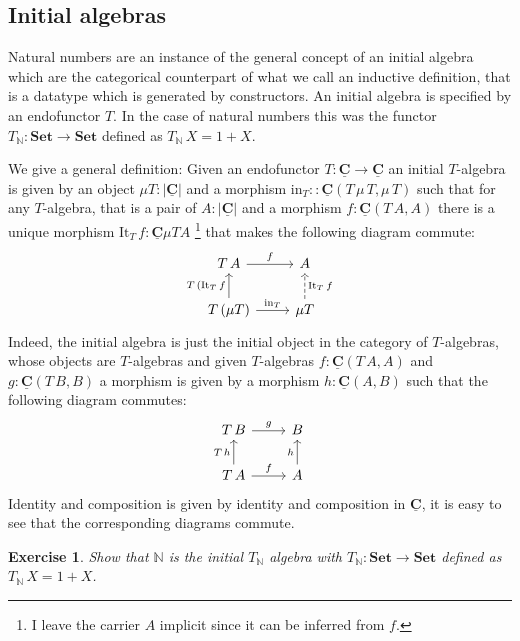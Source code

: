 \documentclass{article}
\newcommand{\Set}{\mathbf{Set}}
\newcommand{\cat}[1]{\underline{\mathbf{#1}}}
\newcommand{\obj}[1]{|#1|}
\newcommand{\homC}[3]{\cat{#1}(#2,#3)}
\newcommand{\Nat}{\mathbb{N}}
\newcommand{\It}{\mathrm{It}}
\newcommand{\inn}{\mathrm{in}}
\newtheorem{exercise}{Exercise}
\begin{document}
\subsection{Initial algebras}
\label{sec:initial-algebras}

Natural numbers are an instance of the general concept of an initial algebra which are the categorical counterpart of what we call an inductive definition, that is a datatype which is generated by constructors. An initial algebra is specified by an endofunctor $T$. In the case of natural numbers this was the functor $T_\Nat : \Set \to \Set$ defined as $T_\Nat\,X = 1+X$. 

We give a general definition: Given an endofunctor $T : \cat{C} \to \cat{C}$ an initial $T$-algebra is given by an object $\mu T : \obj{\cat{C}}$ and a morphism $\inn_T : : \homC{C}{T\,\mu\,T}{\mu\,T}$ such that for any $T$-algebra, that is a pair of $A : \obj{\cat{C}}$ and a morphism 
$f : \homC{C}{T\,A}{A}$ there is a unique morphism $\It_T \,f: \cat{C}{\mu T}{A}$
\footnote{I leave the carrier $A$ implicit since it can be inferred from $f$.}
that makes the following diagram commute:
\[\begin{tikzcd}
T\,A \arrow[r,"f"]  & A \\
T\,(\mu T) \arrow[u, "T\, (\It_T \, f"]  \arrow[r,"\inn_T"] & \mu T \arrow[u,"\It_T \, f" right,dashrightarrow]
\end{tikzcd}\]  
Indeed, the initial algebra is just the initial object in the category of $T$-algebras, whose objects are $T$-algebras and given $T$-algebras $f : \homC{C}{T\,A}{A}$ and $g : \homC{C}{T\,B}{B}$ a morphism is given by a morphism $h : \homC{C}{A}{B}$ such that the following diagram commutes:
\[\begin{tikzcd}
T\,B \arrow[r,"g"] & B \\
 T\,A \arrow[r,"f"] \arrow[u,"T\,h"]  & A \arrow[u,"h"] 
\end{tikzcd}\]  
Identity and composition is given by identity and composition in $\cat{C}$, it is easy to see that the corresponding diagrams commute. 

\begin{exercise}
Show that $\Nat$ is the initial $T_\Nat$ algebra with $T_\Nat : \Set \to \Set$ defined as $T_\Nat\,X = 1+X$. 
\end{exercise}
\end{document}
